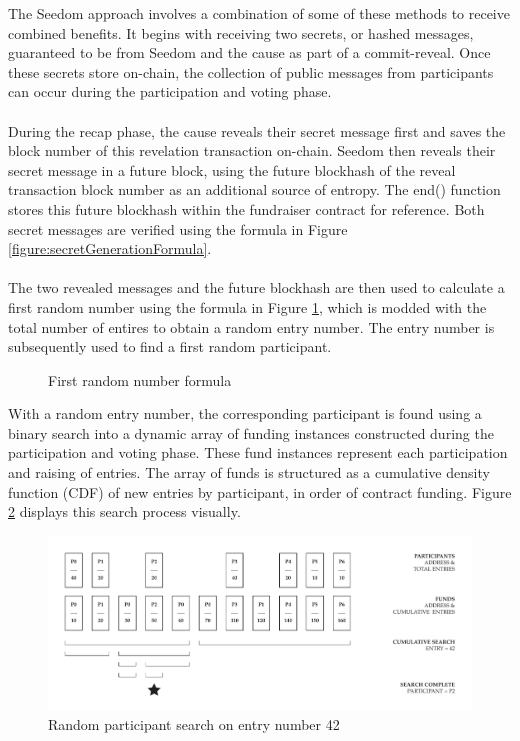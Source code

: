 \documentclass[11pt]{article}
\begin{document}
The Seedom approach involves a combination of some of these methods to receive combined benefits. It begins with receiving two secrets, or hashed messages, guaranteed to be from Seedom and the cause as part of a commit-reveal. Once these secrets store on-chain, the collection of public messages from participants can occur during the participation and voting phase.\\\\
During the recap phase, the cause reveals their secret message first and saves the block number of this revelation transaction on-chain. Seedom then reveals their secret message in a future block, using the future blockhash of the reveal transaction block number as an additional source of entropy. The end() function stores this future blockhash within the fundraiser contract for reference. Both secret messages are verified using the formula in Figure \ref{figure:secretGenerationFormula}.\\\\
The two revealed messages and the future blockhash are then used to calculate a first random number using the formula in Figure \ref{figure:firstRandomNumberForumla}, which is modded with the total number of entires to obtain a random entry number. The entry number is subsequently used to find a first random participant.

\begin{figure}[H]
\begin{center}
\caption{First random number formula}
\label{figure:firstRandomNumberForumla}
\end{center}
\end{figure}

With a random entry number, the corresponding participant is found using a binary search into a dynamic array of funding instances constructed during the participation and voting phase. These fund instances represent each participation and raising of entries. The array of funds is structured as a cumulative density function (CDF) of new entries by participant, in order of contract funding. Figure \ref{figure:randomParticipantSearch} displays this search process visually.

\begin{figure}[H]
\begin{center}
\includegraphics[width=1.0\textwidth]{./graphics/random-participant-search.pdf}
\caption{Random participant search on entry number 42}
\label{figure:randomParticipantSearch}
\end{center}
\end{figure}
\end{document}

